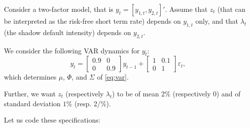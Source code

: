 \documentclass[
  12pt,
]{book}
\theoremstyle{definition}
\theoremstyle{definition}
\theoremstyle{definition}
\theoremstyle{definition}
\theoremstyle{remark}
\begin{document}
Consider a two-factor model, that is \(y_t = [y_{1,t},y_{2,t}]'\). Assume that \(z_t\) (that can be interpreted as the risk-free short term rate) depends on \(y_{1,t}\) only, and that \(\lambda_t\) (the shadow default intensity) depends on \(y_{2,t}\).

We consider the following VAR dynamics for \(y_t\):
\[
y_t = \left[\begin{array}{cc}0.9 & 0 \\ 0 & 0.9\end{array}\right] y_{t-1} +
\left[\begin{array}{cc}1 & 0.1 \\ 0 & 1\end{array}\right]\varepsilon_t,
\]
which determines \(\mu\), \(\Phi\), and \(\Sigma\) of \eqref{eq:var}.

Further, we want \(z_t\) (respectively \(\lambda_t\)) to be of mean 2\% (respectively 0) and of standard deviation \(1\%\) (resp. 2/\%).

Let us code these specifications:
\end{document}
